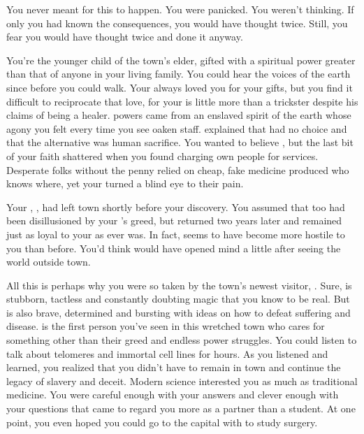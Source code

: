 \documentclass[char]{Pestilence}
\begin{document}
\name{\cRebel{}}

You never meant for this to happen. You were panicked. You weren't thinking. If only you had known the consequences, you would have thought twice. Still, you fear you would have thought twice and done it anyway.

You're the younger child of the town's elder, gifted with a spiritual power greater than that of anyone in your living family. You could hear the voices of the earth since before you could walk. Your \cElder{\parent} always loved you for your gifts, but you find it difficult to reciprocate that love, for your \cElder{\parent} is little more than a trickster despite his claims of being a healer. \cElder{\Their} powers came from an enslaved spirit of the earth whose agony you felt every time you see \cElder{\their} oaken staff. \cElder{\They} explained that \cElder{\they} had no choice and that the alternative was human sacrifice. You wanted to believe \cElder{\them}, but the last bit of your faith shattered when you found \cElder{\them} charging \cElder{\their} own people for \cElder{\their} services. Desperate folks without the penny relied on cheap, fake medicine produced who knows where, yet your \cElder{\parent} turned a blind eye to their pain.

Your \cApprentice{\sibling}, \cApprentice{}, had left town shortly before your discovery. You assumed that \cApprentice{\they} too had been disillusioned by your \cElder{\parent}'s greed, but \cApprentice{\they} returned two years later and remained just as loyal to your \cElder{\parent} as \cApprentice{\they} ever was. In fact, \cApprentice{\they} seems to have become more hostile to you than before. You'd think \cApprentice{} would have opened \cApprentice{\their} mind a little after seeing the world outside town.   

All this is perhaps why you were so taken by the town's newest visitor, \cOutsider{\intro}. Sure, \cOutsider{\they} is stubborn, tactless and constantly doubting magic that you know to be real. But \cOutsider{\they} is also brave, determined and bursting with ideas on how to defeat suffering and disease. \cOutsider{\They} is the first person you've seen in this wretched town who cares for something other than their greed and endless power struggles. You could listen to \cOutsider{\them} talk about telomeres and immortal cell lines for hours. As you listened and learned, you realized that you didn't have to remain in town and continue the legacy of slavery and deceit. Modern science interested you as much as traditional medicine. You were careful enough with your answers and clever enough with your questions that \cOutsider{} came to regard you more as a partner than a student. At one point, you even hoped you could go to the capital with \cOutsider{\them} to study surgery.
\end{document}

